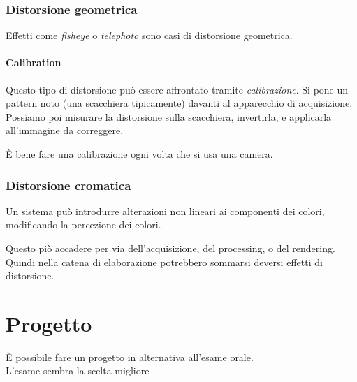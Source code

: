 \documentclass{article}
\begin{document}
\subsubsection{Distorsione geometrica}
Effetti come \textit{fisheye} o \textit{telephoto} sono casi di distorsione geometrica. 

\paragraph{Calibration}
Questo tipo di distorsione può essere affrontato tramite \textit{calibrazione}.
Si pone un pattern noto (una scacchiera tipicamente) davanti al apparecchio di acquisizione. Possiamo poi misurare la distorsione sulla scacchiera, invertirla, e applicarla all'immagine da correggere.

È bene fare una calibrazione ogni volta che si usa una camera.

\subsubsection{Distorsione cromatica}
Un sistema può introdurre alterazioni non lineari ai componenti dei colori, modificando la percezione dei colori.

Questo piò accadere per via dell'acquisizione, del processing, o del rendering. Quindi nella catena di elaborazione potrebbero sommarsi deversi effetti di distorsione.

\section{Progetto}
È possibile fare un progetto in alternativa all'esame orale.\\
L'esame sembra la scelta migliore
\end{document}
